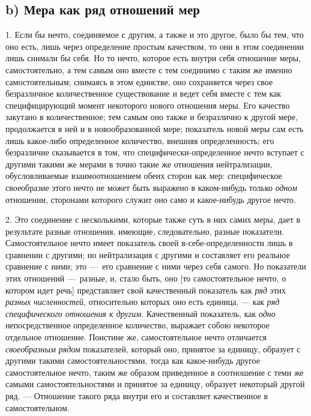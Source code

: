 \subsection[b) Мера как ряд отношений мер]{b) Мера как ряд отношений мер}
1. Если бы нечто, соединяемое с другим, а также
и это другое, было бы тем, что оно есть, лишь через определение простым
качеством, то они в этом соединении лишь снимали бы себя. Но то нечто,
которое есть внутри себя отношение меры, самостоятельно, а тем самым оно
вместе с тем соединимо с таким же именно самостоятельным; снимаясь в этом
единстве, оно сохраняется через свое безразличное количественное
существование и ведет себя вместе с тем как специфицирующий момент
некоторого нового отношения меры. Его качество закутано в количественное;
тем самым оно также и безразлично к другой мере, продолжается в ней и в
новообразованной мере; показатель новой меры сам есть лишь какое-либо
определенное количество, внешняя определенность; его безразличие
сказывается в том, что специфически-определенное нечто вступает с другими
такими же мерами в точно такие же отношения нейтрализации, обусловливаемые
взаимоотношением обеих сторон как мер: специфическое своеобразие этого
нечто не может быть выражено в каком-нибудь только
{\em одном} отношении, сторонами которого служит оно
само и какое-нибудь другое нечто.

2. Это соединение с несколькими, которые также суть в них самих меры, дает в
результате разные отношения, имеющие, следовательно, разные показатели.
Самостоятельное нечто имеет показатель своей в-себе-определенности лишь в
сравнении с другими; но нейтрализация с другими и составляет его реальное
сравнение с ними; это —~его сравнение с ними через себя самого. Но
показатели этих отношений —~разные, и, стало быть, оно [то самостоятельное
нечто, о котором идет речь] представляет свой качественный показатель как
{\em ряд} этих {\em разных
численностей}, относительно которых оно есть единица, — как
{\em ряд специфического отношения к другим}.
Качественный показатель, как {\em одно}
непосредственное определенное количество, выражает собою некоторое
отдельное отношение. Поистине же, самостоятельное нечто отличается
{\em своеобразным рядом} показателей, который оно,
принятое за единицу, образует с другими такими самостоятельностями, тогда
как какое-нибудь другое самостоятельное нечто, таким же образом приведенное
в соотношение с теми же самыми самостоятельностями и принятое за единицу,
образует некоторый другой ряд. — Отношение такого ряда внутри его и
составляет качественное в самостоятельном.


